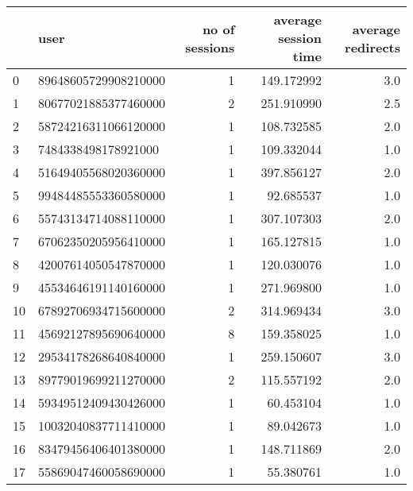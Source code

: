 \begin{tabular}{llrrr}
\toprule
{} &                  user &  no of sessions &  average session time &  average redirects \\
\midrule
0  &  89648605729908210000 &               1 &            149.172992 &                3.0 \\
1  &  80677021885377460000 &               2 &            251.910990 &                2.5 \\
2  &  58724216311066120000 &               1 &            108.732585 &                2.0 \\
3  &   7484338498178921000 &               1 &            109.332044 &                1.0 \\
4  &  51649405568020360000 &               1 &            397.856127 &                2.0 \\
5  &  99484485553360580000 &               1 &             92.685537 &                1.0 \\
6  &  55743134714088110000 &               1 &            307.107303 &                2.0 \\
7  &  67062350205956410000 &               1 &            165.127815 &                1.0 \\
8  &  42007614050547870000 &               1 &            120.030076 &                1.0 \\
9  &  45534646191140160000 &               1 &            271.969800 &                1.0 \\
10 &  67892706934715600000 &               2 &            314.969434 &                3.0 \\
11 &  45692127895690640000 &               8 &            159.358025 &                1.0 \\
12 &  29534178268640840000 &               1 &            259.150607 &                3.0 \\
13 &  89779019699211270000 &               2 &            115.557192 &                2.0 \\
14 &  59349512409430426000 &               1 &             60.453104 &                1.0 \\
15 &  10032040837711410000 &               1 &             89.042673 &                1.0 \\
16 &  83479456406401380000 &               1 &            148.711869 &                2.0 \\
17 &  55869047460058690000 &               1 &             55.380761 &                1.0 \\
\bottomrule
\end{tabular}
